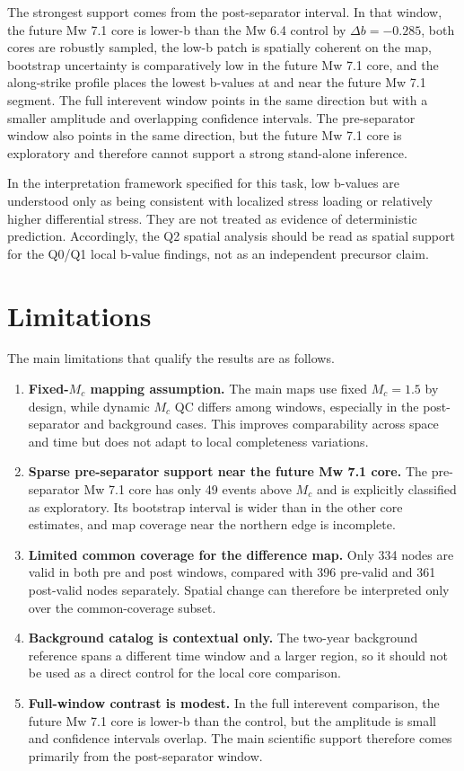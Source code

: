 \documentclass[11pt]{article}
\begin{document}
The strongest support comes from the post-separator interval. In that window, the future Mw 7.1 core is lower-b than the Mw 6.4 control by $\Delta b=-0.285$, both cores are robustly sampled, the low-b patch is spatially coherent on the map, bootstrap uncertainty is comparatively low in the future Mw 7.1 core, and the along-strike profile places the lowest b-values at and near the future Mw 7.1 segment. The full interevent window points in the same direction but with a smaller amplitude and overlapping confidence intervals. The pre-separator window also points in the same direction, but the future Mw 7.1 core is exploratory and therefore cannot support a strong stand-alone inference.

In the interpretation framework specified for this task, low b-values are understood only as being consistent with localized stress loading or relatively higher differential stress. They are not treated as evidence of deterministic prediction. Accordingly, the Q2 spatial analysis should be read as spatial support for the Q0/Q1 local b-value findings, not as an independent precursor claim.

\section{Limitations}
The main limitations that qualify the results are as follows.
\begin{enumerate}[leftmargin=1.5em]
\item \textbf{Fixed-$M_c$ mapping assumption.} The main maps use fixed $M_c=1.5$ by design, while dynamic $M_c$ QC differs among windows, especially in the post-separator and background cases. This improves comparability across space and time but does not adapt to local completeness variations.
\item \textbf{Sparse pre-separator support near the future Mw 7.1 core.} The pre-separator Mw 7.1 core has only 49 events above $M_c$ and is explicitly classified as exploratory. Its bootstrap interval is wider than in the other core estimates, and map coverage near the northern edge is incomplete.
\item \textbf{Limited common coverage for the difference map.} Only 334 nodes are valid in both pre and post windows, compared with 396 pre-valid and 361 post-valid nodes separately. Spatial change can therefore be interpreted only over the common-coverage subset.
\item \textbf{Background catalog is contextual only.} The two-year background reference spans a different time window and a larger region, so it should not be used as a direct control for the local core comparison.
\item \textbf{Full-window contrast is modest.} In the full interevent comparison, the future Mw 7.1 core is lower-b than the control, but the amplitude is small and confidence intervals overlap. The main scientific support therefore comes primarily from the post-separator window.
\end{enumerate}
\end{document}
